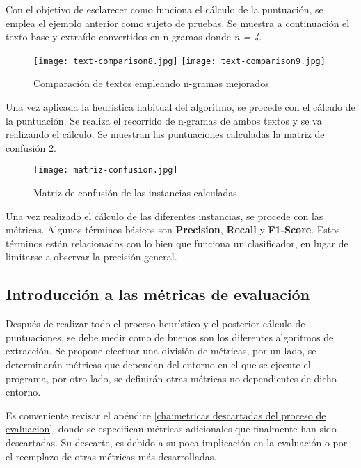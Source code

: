 Con el objetivo de esclarecer como funciona el cálculo de la puntuación, se emplea el ejemplo anterior
como sujeto de pruebas. Se muestra a continuación el texto base y extraído convertidos en n-gramas donde 
\emph{n = 4}.

\begin{figure}[tphb]
  \centering
  \texttt{[image: text-comparison8.jpg]}
  \texttt{[image: text-comparison9.jpg]}
  \caption{Comparación de textos empleando n-gramas mejorados}
  \label{img:comparacion de textos empleando n-gramas mejorados}
\end{figure}

Una vez aplicada la heurística habitual del algoritmo, se procede con el cálculo de la puntuación. Se
realiza el recorrido de n-gramas de ambos textos y se va realizando el cálculo. Se muestran las puntuaciones 
calculadas la matriz de confusión \ref{img:matriz de confusion de las instancias calculadas}.

\begin{figure}[tphb]
  \centering
  \texttt{[image: matriz-confusion.jpg]}
  \caption{Matriz de confusión de las instancias calculadas}
  \label{img:matriz de confusion de las instancias calculadas}
\end{figure}

Una vez realizado el cálculo de las diferentes instancias, se procede con las métricas. Algunos términos 
básicos son \textbf{Precision}, \textbf{Recall} y \textbf{F1-Score}. Estos términos están relacionados con 
lo bien que funciona un clasificador, en lugar de limitarse a observar la precisión general.

\subsection{Introducción a las métricas de evaluación}
\label{subsec:introduccion a las metricas de evaluacion}

Después de realizar todo el proceso heurístico y el posterior cálculo de puntuaciones, se debe medir como 
de buenos son los diferentes algoritmos de extracción. Se propone efectuar una división de métricas, por 
un lado, se determinarán métricas que dependan del entorno en el que se ejecute el programa, por otro lado,
se definirán otras métricas no dependientes de dicho entorno. 

Es conveniente revisar el apéndice \ref{cha:metricas descartadas del proceso de evaluacion}, donde se 
especifican métricas adicionales que finalmente han sido descartadas. Su descarte, es debido a su poca 
implicación en la evaluación o por el reemplazo de otras métricas más desarrolladas.

